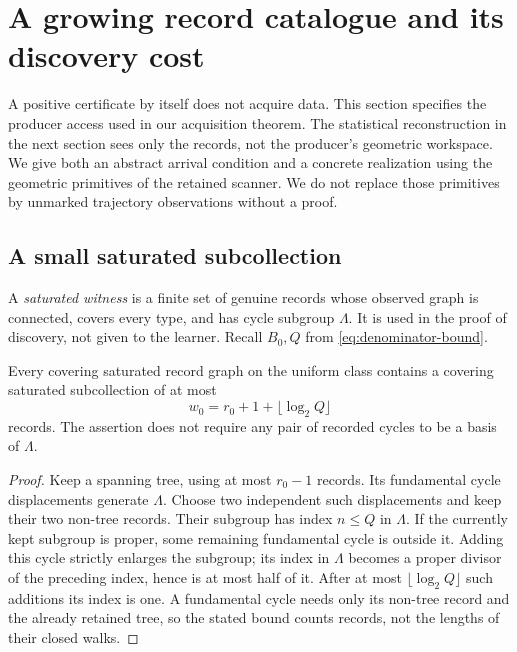 \section{A growing record catalogue and its discovery cost}
\label{sec:catalogue}
A positive certificate by itself does not acquire data. This section
specifies the producer access used in our acquisition theorem. The
statistical reconstruction in the next section sees only the records,
not the producer's geometric workspace. We give both an abstract arrival
condition and a concrete realization using the geometric primitives of
the retained scanner. We do not replace those primitives by unmarked
trajectory observations without a proof.

\subsection{A small saturated subcollection}
A \emph{saturated witness} is a finite set of genuine records whose
observed graph is connected, covers every type, and has cycle subgroup
$\Lambda$. It is used in the proof of discovery, not given to the learner.
Recall $B_0,Q$ from \eqref{eq:denominator-bound}.

\begin{lemma}\label{lem:small-witness}
Every covering saturated record graph on the uniform class contains a
covering saturated subcollection of at most
\begin{equation}\label{eq:witness-size}
                  w_0=r_0+1+\lfloor\log_2 Q\rfloor
\end{equation}
records. The assertion does not require any pair of recorded cycles to
be a basis of $\Lambda$.
\end{lemma}
\begin{proof}
Keep a spanning tree, using at most $r_0-1$ records. Its fundamental
cycle displacements generate $\Lambda$. Choose two independent such
displacements and keep their two non-tree records. Their subgroup has
index $n\le Q$ in $\Lambda$. If the currently kept subgroup is proper,
some remaining fundamental cycle is outside it. Adding this cycle strictly
enlarges the subgroup; its index in $\Lambda$ becomes a proper divisor
of the preceding index, hence is at most half of it. After at most
$\lfloor\log_2 Q\rfloor$ such additions its index is one. A fundamental
cycle needs only its non-tree record and the already retained tree, so
the stated bound counts records, not the lengths of their closed walks.
\end{proof}

